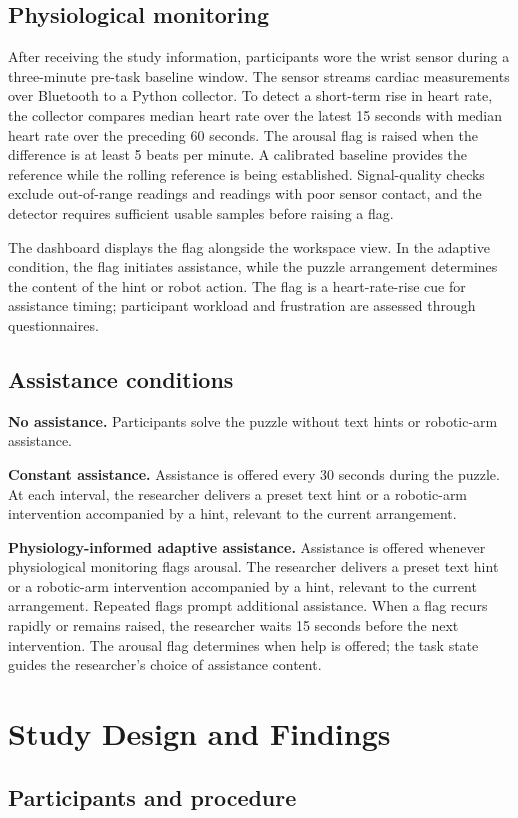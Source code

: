 \documentclass[sigconf,anonymous,balance=false]{aamas}
\providecommand{\DIFadd}[1]{{\protect\color{blue} \sf #1}} %
\providecommand{\DIFdel}[1]{{\protect\color{red} \scriptsize #1}} %
\providecommand{\DIFaddbegin}{} %
\providecommand{\DIFaddend}{} %
\providecommand{\DIFdelbegin}{} %
\providecommand{\DIFdelend}{} %
\begin{document}
\subsection{Physiological monitoring}

After receiving the study information, participants wore the wrist sensor during a three-minute pre-task baseline window. The sensor streams cardiac measurements over Bluetooth to a Python collector. To detect a short-term rise in heart rate, the collector compares median heart rate over the latest 15 seconds with median heart rate over the preceding 60 seconds. The arousal flag is raised when the difference is at least 5 beats per minute. A calibrated baseline provides the reference while the rolling reference is being established. Signal-quality checks exclude out-of-range readings and readings with poor sensor contact, and the detector requires sufficient usable samples before raising a flag.

The dashboard displays the flag alongside the workspace view. In the adaptive condition, the flag initiates assistance, while the puzzle arrangement determines the content of the hint or robot action. The flag is a heart-rate-rise cue for assistance timing; participant workload and frustration are assessed through questionnaires.

\subsection{Assistance conditions}

\textbf{No assistance.} Participants solve the puzzle without text hints or robotic-arm assistance.

\textbf{Constant assistance.} Assistance is offered every 30 seconds during the puzzle. At each interval, the researcher delivers a preset text hint or a robotic-arm intervention accompanied by a hint, relevant to the current arrangement.

\textbf{Physiology-informed adaptive assistance.} Assistance is offered whenever physiological monitoring flags arousal. The researcher delivers a preset text hint or a robotic-arm intervention accompanied by a hint, relevant to the current arrangement. Repeated flags prompt additional assistance. When a flag recurs rapidly or remains raised, the researcher waits 15 seconds before the next intervention. The arousal flag determines when help is offered; the task state guides the researcher’s choice of assistance content.

\DIFdelbegin \section{\DIFdel{Study Design and Findings}}
\addtocounter{section}{-1}%
\DIFdelend \setcounter{section}{4}\setcounter{subsection}{3}
\DIFaddbegin \subsection{\DIFadd{Participants and procedure}}
\DIFaddend 
\end{document}
